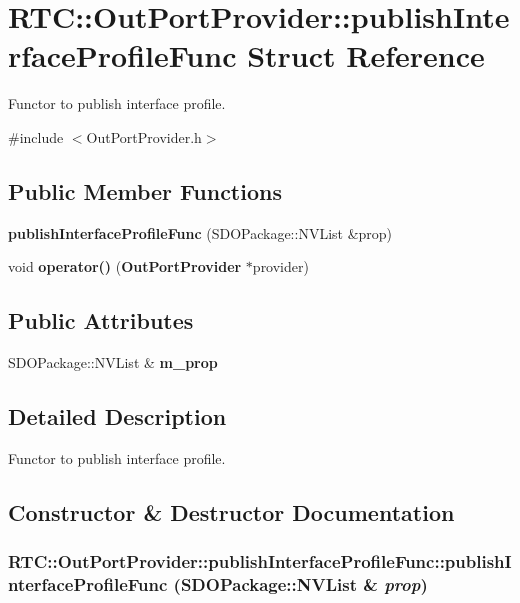 \section{RTC::OutPortProvider::publishInterfaceProfileFunc Struct Reference}
\label{structRTC_1_1OutPortProvider_1_1publishInterfaceProfileFunc}


Functor to publish interface profile.  




{\ttfamily \#include $<$OutPortProvider.h$>$}

\subsection*{Public Member Functions}
\begin{DoxyCompactItemize}
\item 
{\bf publishInterfaceProfileFunc} (SDOPackage::NVList \&prop)
\item 
void {\bf operator()} ({\bf OutPortProvider} $\ast$provider)
\end{DoxyCompactItemize}
\subsection*{Public Attributes}
\begin{DoxyCompactItemize}
\item 
SDOPackage::NVList \& {\bf m\_\-prop}
\end{DoxyCompactItemize}


\subsection{Detailed Description}
Functor to publish interface profile. 

\subsection{Constructor \& Destructor Documentation}
\subsubsection[{publishInterfaceProfileFunc}]{\setlength{\rightskip}{0pt plus 5cm}RTC::OutPortProvider::publishInterfaceProfileFunc::publishInterfaceProfileFunc (SDOPackage::NVList \& {\em prop})\hspace{0.3cm}{\ttfamily  [inline]}}\label{structRTC_1_1OutPortProvider_1_1publishInterfaceProfileFunc_a5aab23c208e03dbcade1405bcdf867c4}



